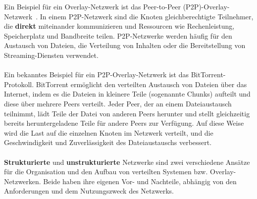 Ein Beispiel für ein Overlay-Netzwerk ist das Peer-to-Peer (P2P)-Overlay-Netzwerk~\cite{tanenbaum2017distributed}. In einem P2P-Netzwerk sind die Knoten gleichberechtigte Teilnehmer, die \textbf{direkt} miteinander kommunizieren und Ressourcen wie Rechenleistung, Speicherplatz und Bandbreite teilen. P2P-Netzwerke werden häufig für den Austausch von Dateien, die Verteilung von Inhalten oder die Bereitstellung von Streaming-Diensten verwendet.
\\\\
Ein bekanntes Beispiel für ein P2P-Overlay-Netzwerk ist das BitTorrent-Protokoll. BitTorrent ermöglicht den verteilten Austausch von Dateien über das Internet, indem es die Dateien in kleinere Teile (sogenannte Chunks) aufteilt und diese über mehrere Peers verteilt. Jeder Peer, der an einem Dateiaustausch teilnimmt, lädt Teile der Datei von anderen Peers herunter und stellt gleichzeitig bereits heruntergeladene Teile für andere Peers zur Verfügung. Auf diese Weise wird die Last auf die einzelnen Knoten im Netzwerk verteilt, und die Geschwindigkeit und Zuverlässigkeit des Dateiaustauschs verbessert.
\\\\
\textbf{Strukturierte} und \textbf{unstrukturierte} Netzwerke sind zwei verschiedene Ansätze für die Organisation und den Aufbau von verteilten Systemen bzw. Overlay-Netzwerken. Beide haben ihre eigenen Vor- und Nachteile, abhängig von den Anforderungen und dem Nutzungszweck des Netzwerks.
